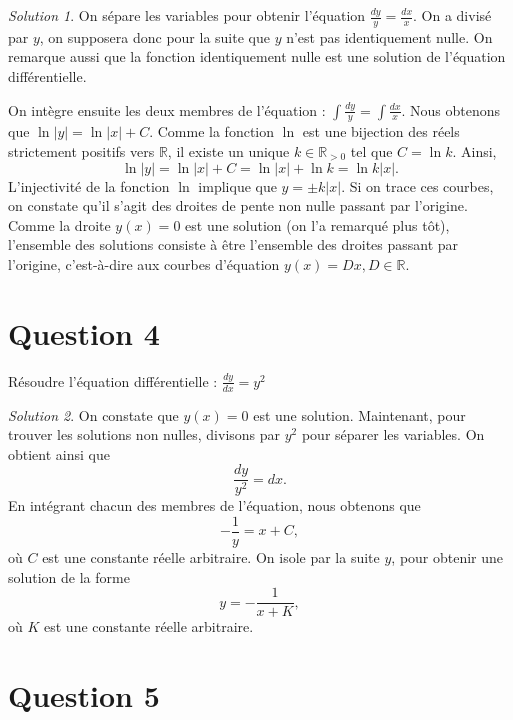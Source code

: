 \documentclass[
  12pt,
  letterpaper,
]{book}
\theoremstyle{remark}
\newtheorem*{solution}{Solution}
\begin{document}
\begin{solution}

On sépare les variables pour obtenir l'équation
\(\frac{dy}{y} = \frac{dx}{x}\). On a divisé par \(y\), on supposera
donc pour la suite que \(y\) n'est pas identiquement nulle. On remarque
aussi que la fonction identiquement nulle est une solution de l'équation
différentielle.

On intègre ensuite les deux membres de l'équation :
\(\int \frac{dy}{y} = \int \frac{dx}{x}\). Nous obtenons que
\(\ln|y| = \ln|x| + C\). Comme la fonction \(\ln\) est une bijection des
réels strictement positifs vers \(\mathbb{R}\), il existe un unique
\(k\in\mathbb{R}_{>0}\) tel que \(C=\ln k\). Ainsi,
\[\ln|y| = \ln|x| + C=\ln|x| + \ln k=\ln k|x|.\] L'injectivité de la
fonction \(\ln\) implique que \(y=\pm k|x|\). Si on trace ces courbes,
on constate qu'il s'agit des droites de pente non nulle passant par
l'origine. Comme la droite \(y(x)=0\) est une solution (on l'a remarqué
plus tôt), l'ensemble des solutions consiste à être l'ensemble des
droites passant par l'origine, c'est-à-dire aux courbes d'équation
\(y(x)=Dx, D\in\mathbb{R}\).

\end{solution}

\hypertarget{question-4-4}{%
\section{Question 4}\label{question-4-4}}

Résoudre l'équation différentielle : \(\frac{dy}{dx} = y^2\)

\begin{solution}

On constate que \(y(x)=0\) est une solution. Maintenant, pour trouver
les solutions non nulles, divisons par \(y^2\) pour séparer les
variables. On obtient ainsi que \[\frac{dy}{y^2} = dx.\] En intégrant
chacun des membres de l'équation, nous obtenons que
\[-\frac{1}{y} = x + C,\] où \(C\) est une constante réelle arbitraire.
On isole par la suite \(y\), pour obtenir une solution de la forme
\[y = -\frac{1}{x + K},\] où \(K\) est une constante réelle arbitraire.

\end{solution}

\hypertarget{question-5-4}{%
\section{Question 5}\label{question-5-4}}
\end{document}
